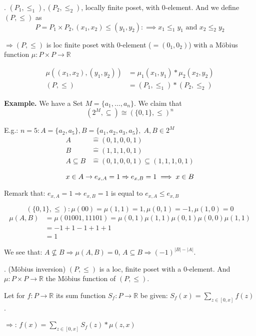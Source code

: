 \Theorem.
$(P_1, \leq_1), (P_2, \leq_2)$, locally finite poset, with 0-element. 
And we define $(P, \leq)$ as 
\[
  P = P_1 \times P_2, (x_1,x_2) \leq (y_1, y_2) :\implies x_1 \leq_1 y_1 \text{ and } x_2 \leq_2 y_2
\]

$\Rightarrow (P, \leq)$ is loc finite poset with 0-element ($=(0_1, 0_2)$) with a Möbius function $\mu: P\times P \rightarrow \mathbb{R}$

\begin{align*}
  \mu ( (x_1, x_2), (y_1,y_2)) &= \mu_1(x_1,y_1) * \mu_2(x_2,y_2) \\
  (P, \leq) &= (P_1, \leq_1) * (P_2, \leq_2)
\end{align*}

\textbf{Example.}
We have a Set $M = \{a_1, \ldots , a_n\}$. We claim that 
\[
  (2^M, \subseteq) \cong ( \{0,1\}, \leq)^n
\]

E.g.: $n = 5: A = \{a_2,a_5\}, B= \{a_1, a_2, a_3, a_5\},\; A, B \in 2^M$
\begin{align*}
  A &\hat{=} (0,1,0,0,1) \\
  B &\hat{=} (1,1,1,0,1) \\
  A \subseteq B &\hat{=} (0,1,0,0,1) \subseteq (1,1,1,0,1) \\
\end{align*}
\[
  x \in A \rightarrow e_{x,A} = 1 \Rightarrow  e_{x,B} = 1 \implies x \in B\\
\]

Remark that: $e_{x,A} = 1 \Rightarrow e_{x,B} = 1$ is equal to $e_{x,A} \leq e_{x,B}$ 

\[
    ( \{0,1\}, \leq): \mu(00) = \mu(1,1) = 1, \mu(0,1) = -1, \mu(1,0) = 0
\]
\begin{align*}
    \mu(A,B) &= \mu(01001, 11101) = \mu(0,1) \mu(1,1) \mu(0,1) \mu(0,0) \mu(1,1) \\
    &= -1 +1 -1 +1 +1 \\
    &= 1
\end{align*}

We see that: 
$A\not\subseteq B \Rightarrow \mu(A,B) = 0$, 
$A\subseteq B \Rightarrow (-1)^{|B| - |A|}$. 

\Theorem.
(Möbius inversion)
$(P, \leq)$ is a loc, finite poset with a 0-element. 
And $\mu: P \times P \rightarrow \mathbb{R}$ the Möbius function of $(P, \leq)$. 

Let for $f: P \rightarrow \mathbb{R}$ its sum function $S_f: P \rightarrow \mathbb{R}$ be given: $S_f(x) = \sum_{z \in [0,x]} f(z)$. 

$\Rightarrow$: $f(x) = \sum_{z \in [0,x]} S_f(z) * \mu(z,x)$

